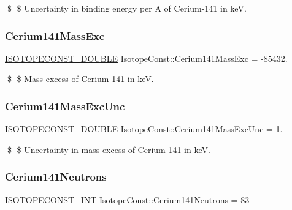 \$ \$ Uncertainty in binding energy per A of Cerium-\/141 in keV. \mbox{\label{group___isotope_const-_cerium-_ce141_ga40f992041cf28c95ac693969a03a83f4}} 
\subsubsection{\texorpdfstring{Cerium141\+Mass\+Exc}{Cerium141MassExc}}
{\footnotesize\ttfamily \mbox{\hyperlink{group___isotope_const-_macros_ga8f45a7272ce02c0b4c65c44636ed719a}{I\+S\+O\+T\+O\+P\+E\+C\+O\+N\+S\+T\+\_\+\+D\+O\+U\+B\+LE}} Isotope\+Const\+::\+Cerium141\+Mass\+Exc = -\/85432.}

\$ \$ Mass excess of Cerium-\/141 in keV. \mbox{\label{group___isotope_const-_cerium-_ce141_gaaf950c359c8717324ecac64b33ba2927}} 
\subsubsection{\texorpdfstring{Cerium141\+Mass\+Exc\+Unc}{Cerium141MassExcUnc}}
{\footnotesize\ttfamily \mbox{\hyperlink{group___isotope_const-_macros_ga8f45a7272ce02c0b4c65c44636ed719a}{I\+S\+O\+T\+O\+P\+E\+C\+O\+N\+S\+T\+\_\+\+D\+O\+U\+B\+LE}} Isotope\+Const\+::\+Cerium141\+Mass\+Exc\+Unc = 1.}

\$ \$ Uncertainty in mass excess of Cerium-\/141 in keV. \mbox{\label{group___isotope_const-_cerium-_ce141_gabfcfbf62c54b6e573f84c75097aec819}} 
\subsubsection{\texorpdfstring{Cerium141\+Neutrons}{Cerium141Neutrons}}
{\footnotesize\ttfamily \mbox{\hyperlink{group___isotope_const-_macros_ga5f18360b3e99483a35c32d789e62621c}{I\+S\+O\+T\+O\+P\+E\+C\+O\+N\+S\+T\+\_\+\+I\+NT}} Isotope\+Const\+::\+Cerium141\+Neutrons = 83}

